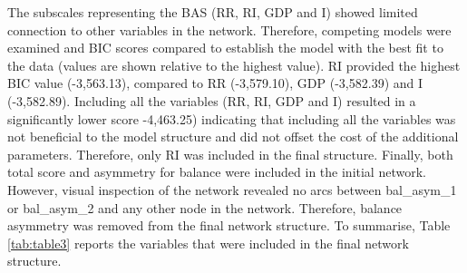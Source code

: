 \documentclass[
  english,
  man]{apa6}
\begin{document}
The subscales representing the BAS (RR, RI, GDP and I) showed limited connection to other variables in the network.
Therefore, competing models were examined and BIC scores compared to establish the model with the best fit to the data (values are shown relative to the highest value).
RI provided the highest BIC value (-3,563.13), compared to RR (-3,579.10), GDP (-3,582.39) and I (-3,582.89).
Including all the variables (RR, RI, GDP and I) resulted in a significantly lower score -4,463.25) indicating that including all the variables was not beneficial to the model structure and did not offset the cost of the additional parameters. Therefore, only RI was included in the final structure.
Finally, both total score and asymmetry for balance were included in the initial network. However, visual inspection of the network revealed no arcs between bal\_asym\_1 or bal\_asym\_2 and any other node in the network.
Therefore, balance asymmetry was removed from the final network structure.
To summarise, Table \ref{tab:table3} reports the variables that were included in the final network structure.
\end{document}
